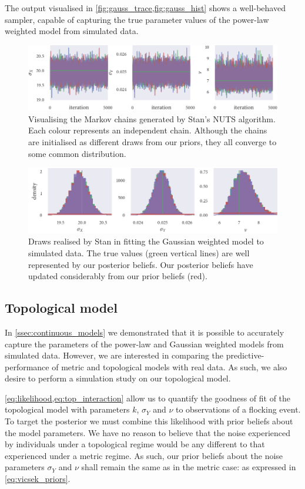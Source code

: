 The output visualised in \cref{fig:gauss_trace,fig:gauss_hist} shows a well-behaved
sampler, capable of capturing the true parameter values of the power-law weighted model
from simulated data.

\begin{figure}[tbp]
  \includegraphics{gauss_trace.pdf}
  \caption{Visualising the Markov chains generated by Stan's NUTS algorithm. Each colour
    represents an independent chain. Although the chains are initialised as different draws
    from our priors, they all converge to some common distribution.}
  \label{fig:gauss_trace}
\end{figure}
\begin{figure}[tbp]
  \includegraphics{gauss_hist.pdf}
  \caption{Draws realised by Stan in fitting the Gaussian weighted model to simulated
    data. The true values (green vertical lines) are well represented by our posterior
    beliefs. Our posterior beliefs have updated considerably from our prior beliefs
    (red).}
  \label{fig:gauss_hist}
\end{figure}

\subsection{Topological model}

In \cref{ssec:continuous_models} we demonstrated that it is possible to accurately capture
the parameters of the power-law and Gaussian weighted models from simulated data. However,
we are interested in comparing the predictive-performance of metric and topological models
with real data. As such, we also desire to perform a simulation study on our topological
model.

\cref{eq:likelihood,eq:top_interaction} allow us to quantify the goodness of fit of the
topological model with parameters $k$, $\sigma_Y$ and $\nu$ to observations of a flocking
event. To target the posterior we must combine this likelihood with prior beliefs about
the model parameters. We have no reason to believe that the noise experienced by
individuals under a topological regime would be any different to that experienced under a
metric regime. As such, our prior beliefs about the noise parameters $\sigma_Y$ and $\nu$
shall remain the same as in the metric case: as expressed in \cref{eq:vicsek_priors}.

